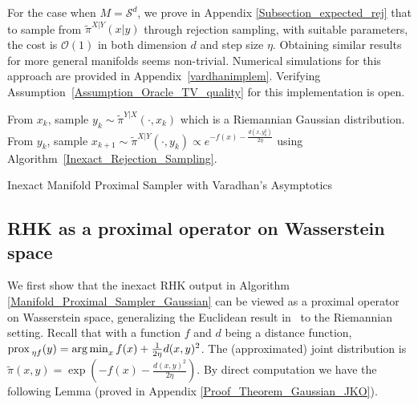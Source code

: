 

For the case when $M = \mathcal{S}^{d}$, we prove in Appendix \ref{Subsection_expected_rej} that to sample from $\tilde{\pi}^{X|Y}(x|y)$ through rejection sampling, with suitable parameters, the cost is $\mathcal{O}(1)$ in both dimension $d$ and step size $\eta$. Obtaining similar results for more general manifolds seems non-trivial. Numerical simulations for this approach are provided in Appendix~\ref{vardhanimplem}. Verifying Assumption~\ref{Assumption_Oracle_TV_quality} for this implementation is open.


\begin{algorithm}[t]
    \begin{algorithmic}
    \STATE From $x_{k}$, sample $y_{k} \sim \tilde{\pi}^{Y|X}(\cdot, x_{k})$ which is a Riemannian Gaussian distribution. 
    \STATE From $y_{k}$, sample $x_{k+1} \sim \tilde{\pi}^{X|Y}(\cdot, y_{k}) \propto e^{-f(x) - \frac{d(x, y_{k}^{2})}{2\eta}} $ using Algorithm~\ref{Inexact_Rejection_Sampling}.
    \ENDFOR
    \end{algorithmic}
    \caption{Inexact Manifold Proximal Sampler with Varadhan's Asymptotics}
    \label{Manifold_Proximal_Sampler_Gaussian} 
\end{algorithm}

\subsection{RHK as a proximal operator on Wasserstein space}
We first show that the inexact RHK output in Algorithm \ref{Manifold_Proximal_Sampler_Gaussian} can be viewed as a proximal operator on Wasserstein space, generalizing the Euclidean result in~\cite{chen2020fast} to the Riemannian setting. 
Recall that with a function $f$ and $d$ being a distance function, 
$\operatorname{prox\,}_{\eta f}(y) = \operatorname*{arg\,min}_{x} f(x) + \frac{1}{2\eta} d(x, y)^{2}$.
The (approximated) joint distribution is $\tilde{\pi}(x, y) = \exp(-f(x) - \frac{d(x, y)^{2}}{2\eta})$.
By direct computation we have the following Lemma (proved in Appendix \ref{Proof_Theorem_Gaussian_JKO}). 

